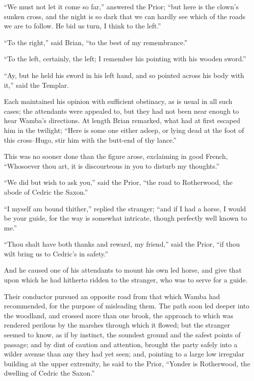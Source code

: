 ``We must not let it come so far,'' answered the Prior; ``but here is
the clown's sunken cross, and the night is so dark that we can hardly
see which of the roads we are to follow. He bid us turn, I think to the
left.''

``To the right,'' said Brian, ``to the best of my remembrance.''

``To the left, certainly, the left; I remember his pointing with his
wooden sword.''

``Ay, but he held his sword in his left hand, and so pointed across his
body with it,'' said the Templar.

Each maintained his opinion with sufficient obstinacy, as is usual in
all such cases; the attendants were appealed to, but they had not been
near enough to hear Wamba's directions. At length Brian remarked, what
had at first escaped him in the twilight; ``Here is some one either
asleep, or lying dead at the foot of this cross--Hugo, stir him with the
butt-end of thy lance.''

This was no sooner done than the figure arose, exclaiming in good
French, ``Whosoever thou art, it is discourteous in you to disturb my
thoughts.''

``We did but wish to ask you,'' said the Prior, ``the road to
Rotherwood, the abode of Cedric the Saxon.''

``I myself am bound thither,'' replied the stranger; ``and if I had a
horse, I would be your guide, for the way is somewhat intricate, though
perfectly well known to me.''

``Thou shalt have both thanks and reward, my friend,'' said the Prior,
``if thou wilt bring us to Cedric's in safety.''

And he caused one of his attendants to mount his own led horse, and give
that upon which he had hitherto ridden to the stranger, who was to serve
for a guide.

Their conductor pursued an opposite road from that which Wamba had
recommended, for the purpose of misleading them. The path soon led
deeper into the woodland, and crossed more than one brook, the approach
to which was rendered perilous by the marshes through which it flowed;
but the stranger seemed to know, as if by instinct, the soundest ground
and the safest points of passage; and by dint of caution and attention,
brought the party safely into a wilder avenue than any they had yet
seen; and, pointing to a large low irregular building at the upper
extremity, he said to the Prior, ``Yonder is Rotherwood, the dwelling of
Cedric the Saxon.''

